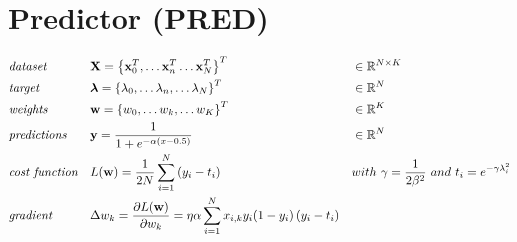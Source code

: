 \documentclass[a4paper]{article}
\begin{document}
\pagebreak
\section*{Predictor (PRED)}
\begin{align}
	& \emph{dataset} &&
    \mathbf{X} = \left\{\mathbf{x}^T_0, 
    \dots\mathbf{x}^T_n \dots\mathbf{x}^T_N\right\}^T &&
    \in \mathbb{R}^{N\times K} \nonumber\\
    & \emph{target} && 
    \boldsymbol{\lambda} = \left\{\lambda_0, \dots\lambda_n, \dots 
    \lambda_N\right\}^T&&\in\mathbb{R}^N \nonumber \\
    & \emph{weights} && 
    \mathbf{w} = \left\{w_0, \dots w_k, \dots w_K\right\}^T && 
    \in \mathbb{R}^K\nonumber\\
	& \emph{predictions} && 
    \mathbf{y} = \frac{1}{1 + e^{-\alpha(x-0.5)}} &&
    \in \mathbb{R}^{N} \nonumber\\
    & \emph{cost function} && 
    L(\mathbf{w}) = \frac{1}{2N}\sum_{i=1}^N 
    {\left(y_i - t_i\right)} && 
    with\ \gamma = \frac{1}{2\beta^2}\ and\ t_i = 
    e^{-\gamma\lambda_i^2}\nonumber\\
    & \emph{gradient} && 
    \Delta w_k = \frac{\partial{L(\mathbf{w})}}
    {\partial{w_k}} = \eta\alpha
    \sum_{i=1}^N x_{i, k} y_i(1-y_i)
    \left(y_i - t_i\right) \nonumber
\end{align}
\end{document}
